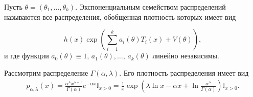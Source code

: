 \begin{definition}
Пусть $\displaystyle \theta =( \theta _{1} ,\dotsc ,\theta _{k})$. Экспоненциальным семейством распределений называются все распределения, обобщенная плотность которых имеет вид


\begin{equation*}
h( x)\exp\left(\sum _{i=1}^{k} a_{i}( \theta ) T_{i}( x) +V( \theta )\right) ,
\end{equation*}
и где функции $\displaystyle a_{0}( \theta ) \equiv 1,\, a_{1}( \theta ) ,\dotsc ,\, a_{k}( \theta )$ линейно независимы.
\end{definition}
\begin{example}
Рассмотрим распределение $\displaystyle \Gamma ( \alpha ,\lambda )$. Его плотность распределения имеет вид
\begin{gather}
    p_{\alpha ,\lambda }( x) =\frac{\alpha ^{\lambda } x^{\lambda -1}}{\Gamma ( \alpha )} e^{-\alpha x}\mathbb{I}_{x >0} =\frac{1}{x}\exp\left( \lambda \ln x-\alpha x+\ln\frac{\alpha ^{\lambda }}{\Gamma ( \alpha )}\right)\mathbb{I}_{x >0}.
\end{gather}
\end{example}

